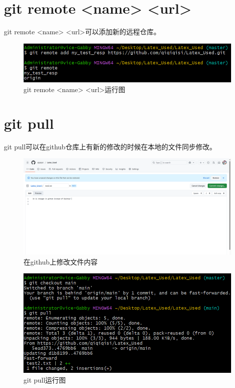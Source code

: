 \documentclass{article}
\begin{document}
\section{git remote <name> <url>}
git remote <name> <url>可以添加新的远程仓库。
\begin{figure}[H]
    \centering
    \includegraphics[width=1\linewidth]{git_remote_name.png}
    \caption{git remote <name> <url>运行图}
    \label{fig:remotename}
\end{figure}

\section{git pull}
git pull可以在github仓库上有新的修改的时候在本地的文件同步修改。
\begin{figure}[H]
    \centering
    \includegraphics[width=1\linewidth]{github修改文件.png}
    \caption{在github上修改文件内容}
    \label{fig:pull}
\end{figure}
\begin{figure}[H]
    \centering
    \includegraphics[width=1\linewidth]{git_pull.png}
    \caption{git pull运行图}
    \label{fig:pull1}
\end{figure}
\end{document}
